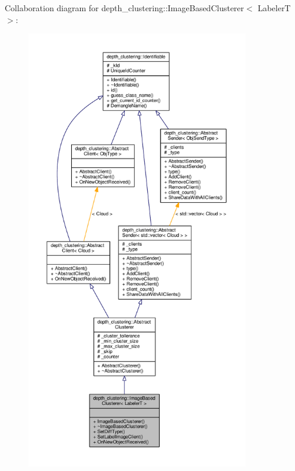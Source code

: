 Collaboration diagram for depth\-\_\-clustering\-:\-:Image\-Based\-Clusterer$<$ Labeler\-T $>$\-:
\nopagebreak
\begin{figure}[H]
\begin{center}
\leavevmode
\includegraphics[height=550pt]{classdepth__clustering_1_1ImageBasedClusterer__coll__graph}
\end{center}
\end{figure}


